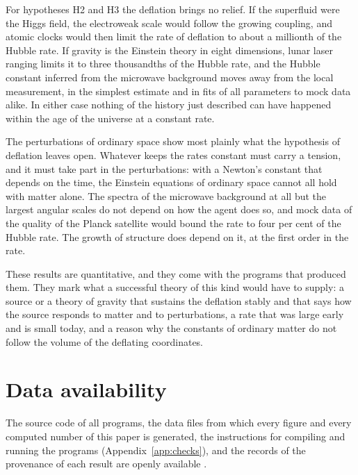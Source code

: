 For hypotheses H2 and H3 the deflation brings no relief. 
If the superfluid were the Higgs field, the electroweak scale would follow the growing coupling, and
atomic clocks would then limit the rate of deflation to about a millionth of the Hubble rate. If
gravity is the Einstein theory in eight dimensions, lunar laser ranging limits it to three
thousandths of the Hubble rate, and the Hubble constant inferred from the microwave background
moves away from the local measurement, in the simplest estimate and in fits of all parameters to
mock data alike. In either case nothing of the history just described can have happened within the
age of the universe at a constant rate.

The perturbations of ordinary space show most plainly what the hypothesis of deflation leaves open.
Whatever keeps the rates constant must carry a tension, and it must take part in the perturbations:
with a Newton's constant that depends on the time, the Einstein equations of ordinary space cannot
all hold with matter alone. The spectra of the microwave background at all but the largest angular
scales do not depend on how the agent does so, and mock data of the quality of the Planck satellite
would bound the rate to four per cent of the Hubble rate. The growth of structure does depend on it,
at the first order in the rate.

These results are quantitative, and they come with the programs that produced them. They mark what
a successful theory of this kind would have to supply: a source or a theory of gravity that sustains
the deflation stably and that says how the source responds to matter and to perturbations, a rate that was large early
and is small today, and a reason why the constants of ordinary matter do not follow the volume of
the deflating coordinates.

\section*{Data availability}

The source code of all programs, the data files from which every figure and every computed number of
this paper is generated, the instructions for compiling and running the programs
(Appendix~\ref{app:checks}), and the records of the provenance of each result are openly available
\cite{DeflationRepo}.

